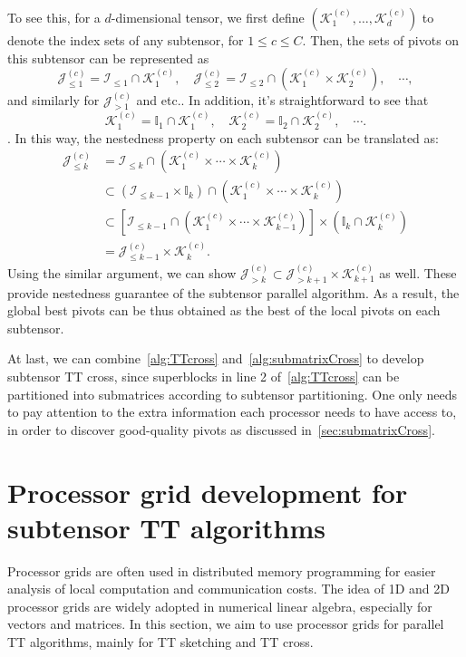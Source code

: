 \documentclass[11pt,a4paper,review]{siamart220329}
\begin{document}
To see this, for a $d$-dimensional tensor, we first define $(\mathcal{K}_1^{(c)},\dots,\mathcal{K}_d^{(c)})$ to denote the index sets of any subtensor, for $1 \le c \le C$. Then, the sets of pivots on this subtensor can be represented as
\[ \mathcal{J}_{\le 1}^{(c)} = \mathcal{I}_{\le 1} \cap \mathcal{K}_1^{(c)}, \quad \mathcal{J}_{\le 2}^{(c)} = \mathcal{I}_{\le 2} \cap (\mathcal{K}_1^{(c)} \times \mathcal{K}_2^{(c)}), \quad\cdots, \] 
and similarly for $\mathcal{J}_{> 1}^{(c)}$ and etc.. In addition, it's straightforward to see that 
\[ \mathcal{K}_1^{(c)} = \mathbb{I}_1 \cap \mathcal{K}_1^{(c)}, \quad \mathcal{K}_2^{(c)} = \mathbb{I}_2 \cap \mathcal{K}_2^{(c)},\quad \cdots. \].
In this way, the nestedness property on each subtensor can be translated as:
\begin{align*}
\mathcal{J}_{\le k}^{(c)} &= \mathcal{I}_{\le k} \cap \left(\mathcal{K}_1^{(c)} \times\cdots\times \mathcal{K}_k^{(c)}\right) \\
&\subset (\mathcal{I}_{\le k-1} \times \mathbb{I}_k) \cap \left(\mathcal{K}_1^{(c)} \times\cdots\times \mathcal{K}_k^{(c)}\right) \\
&\subset \left[\mathcal{I}_{\le k-1} \cap \left(\mathcal{K}_1^{(c)} \times\cdots\times \mathcal{K}_{k-1}^{(c)}\right)\right] \times \left( \mathbb{I}_k \cap \mathcal{K}_k^{(c)}\right) \\
&= \mathcal{J}_{\le k-1}^{(c)} \times \mathcal{K}_k^{(c)}.
\end{align*}
Using the similar argument, we can show $\mathcal{J}_{>k}^{(c)} \subset \mathcal{J}_{>k+1}^{(c)} \times \mathcal{K}_{k+1}^{(c)}$ as well. These provide nestedness guarantee of the subtensor parallel algorithm. As a result, the global best pivots can be thus obtained as the best of the local pivots on each subtensor.

At last, we can combine~\cref{alg:TTcross} and~\cref{alg:submatrixCross} to develop subtensor TT cross, since superblocks in line 2 of~\cref{alg:TTcross} can be partitioned into submatrices according to subtensor partitioning. One only needs to pay attention to the extra information each processor needs to have access to, in order to discover good-quality pivots as discussed in~\cref{sec:submatrixCross}.

\section{Processor grid development for subtensor TT algorithms}
\label{sec:subComm}
Processor grids are often used in distributed memory programming for easier analysis of local computation and communication costs. The idea of 1D and 2D processor grids are widely adopted in numerical linear algebra, especially for vectors and matrices. In this section, we aim to use processor grids for parallel TT algorithms, mainly for TT sketching and TT cross.
\end{document}
